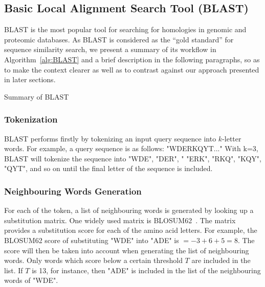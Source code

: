 \documentclass[titlepage]{csetr}
\begin{document}
\subsection{Basic Local Alignment Search Tool (BLAST)}

BLAST is the most popular tool for searching for homologies in genomic and proteomic databases. As BLAST is considered as the ``gold standard'' for sequence similarity search, we present a summary of its workflow in Algorithm~\ref{alg:BLAST} and a brief description in the following paragraphs, so as to make the context clearer as well as to contrast against our approach presented in later sections. 

\begin{algorithm}
 \caption{Summary of BLAST}
 \SetAlgoLined
   {
    }
\label{alg:BLAST}
\end{algorithm}


\subsubsection{Tokenization}
BLAST performs firstly by tokenizing an input query sequence into $k$-letter words. For example, a query sequence is as follows: "WDERKQYT..." With k=3, BLAST will tokenize the sequence into "WDE", "DER", " "ERK", "RKQ", "KQY", "QYT", and so on until the final letter of the sequence is included.

\subsubsection{Neighbouring Words Generation}
For each of the token, a list of neighbouring words is generated by looking up a substitution matrix. One widely used matrix is BLOSUM62~\cite{henikoff_amino_1992}. The matrix provides a substitution score for each of the amino acid letters. For example, the BLOSUM62 score of substituting "WDE" into "ADE" is $ = -3 + 6 +5 = 8$. The score will then be taken into account when generating the list of neighbouring words. Only words which score below a certain threshold $T$ are included in the list. If $T$ is 13, for instance, then "ADE" is included in the list of the neighbouring words of "WDE".
\end{document}
